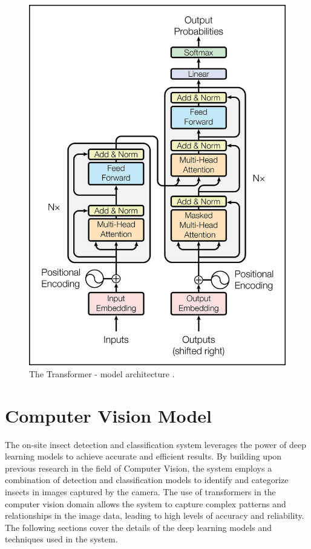 \begin{figure}[H]
\begin{center}
\includegraphics[width=0.85\linewidth]{Honors_Thesis/Figures/3.1.png}
\end{center}
\caption{The Transformer - model architecture \cite{transformers_1}.}
\label{fig:3.1}
\end{figure}

\section{Computer Vision Model}
The on-site insect detection and classification system leverages the power of deep learning models to achieve accurate and efficient results. By building upon previous research in the field of Computer Vision, the system employs a combination of detection and classification models to identify and categorize insects in images captured by the camera. The use of transformers in the computer vision domain allows the system to capture complex patterns and relationships in the image data, leading to high levels of accuracy and reliability. The following sections cover the details of the deep learning models and techniques used in the system.


